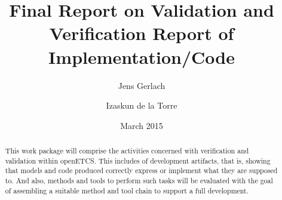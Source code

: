 \documentclass{template/openetcs_report}
\numberwithin{figure}{chapter}
\numberwithin{table}{chapter}
\begin{document}
\frontmatter
{}




\title{Final Report on Validation and Verification Report of Implementation/Code}


\date{March 2015}






\author{Jens Gerlach}

\author{Izaskun de la Torre}




\begin{abstract}
  This work package will comprise the activities concerned with
  verification and validation within openETCS. This includes \vv of
  development artifacts, that is, showing that models and code
  produced correctly express or implement what they are supposed
  to. And also, methods and tools to perform such tasks will be
  evaluated with the goal of assembling a suitable method and tool
  chain to support a full development.
\end{abstract}

\maketitle
\tableofcontents
\listoffiguresandtables
\clearpage
{}
\listoffixmes
\cleardoublepage
\end{document}
